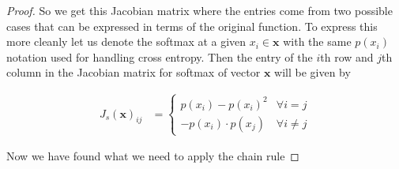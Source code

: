 \documentclass[11pt]{article}
\newcommand{\bs}{\boldsymbol}
\begin{document}
\begin{proof}
	So we get this Jacobian matrix where the entries come from two possible
	cases that can be expressed in terms of the original function. To express
	this more cleanly let us denote the softmax at a given $x_i \in \bs{x}$
	with the same $p(x_i)$ notation used for handling cross entropy.
	Then the entry of the $i$th row and $j$th column in the Jacobian matrix for
	softmax of vector $\bs{x}$ will be given by

	\begin{align}
		J_s(\bs{x})_{i j} &= \begin{cases}
			p(x_i) - p(x_i)^2 & \forall i=j \\
			- p(x_i) \cdot p(x_j) & \forall i\neq j
		\end{cases}
	\end{align}

	Now we have found what we need to apply the chain rule


\end{proof}
\end{document}
